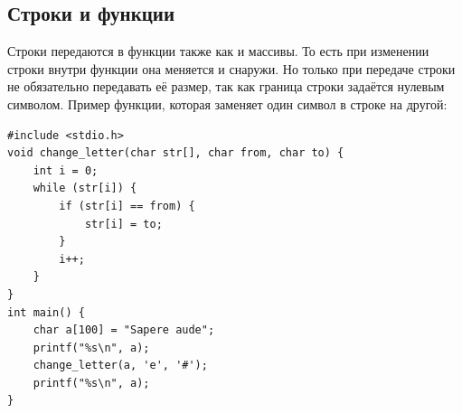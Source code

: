 \documentclass{article}
\begin{document}
\subsection*{Строки и функции}
Строки передаются в функции также как и массивы. То есть при изменении строки внутри функции она меняется и снаружи. Но только при передаче строки не обязательно передавать её размер, так как граница строки задаётся нулевым символом. Пример функции, которая заменяет один символ в строке на другой:
\begin{lstlisting}
#include <stdio.h>
void change_letter(char str[], char from, char to) {
    int i = 0;
    while (str[i]) {
        if (str[i] == from) {
            str[i] = to;
        }
        i++;
    }
}
int main() {
    char a[100] = "Sapere aude";
    printf("%s\n", a);
    change_letter(a, 'e', '#');
    printf("%s\n", a);
}

\end{lstlisting}
\end{document}
